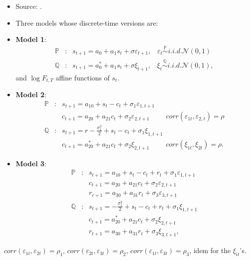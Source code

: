 \documentclass[
  12pt,
]{book}
\providecommand{\tightlist}{%
  \setlength{\itemsep}{0pt}\setlength{\parskip}{0pt}}
\theoremstyle{definition}
\theoremstyle{definition}
\theoremstyle{definition}
\theoremstyle{definition}
\theoremstyle{remark}
\begin{document}
\begin{itemize}
\tightlist
\item
  Source: \citet{Schwartz_1997}.
\item
  Three models whose discrete-time versions are:
\item
  \textbf{Model 1}:
  \begin{eqnarray*}
  \mathbb{P}&:& s_{t+1} = a_0 + a_1 s_t + \sigma \varepsilon_{t+1}, \; \; \; \varepsilon_t \stackrel{\mathbb{P}}{\sim}  i.i.d. \mathcal{N}(0,1) \\
  \mathbb{Q} &:& s_{t+1} = a^*_0 + a_1 s_t + \sigma \xi_{t+1}, \; \; \; \xi_{t} \stackrel{\mathbb{Q}}{\sim}  i.i.d. \mathcal{N}(0,1),
  \end{eqnarray*}
  and \(\log F_{t,T}\) affine functions of \(s_t\).
\item
  \textbf{Model 2}:
  \begin{eqnarray*}
  \mathbb{P}&:& s_{t+1} = a_{10} + s_t - c_t + \sigma_1 \varepsilon_{1,t+1}\\
  && c_{t+1} = a_{20} + a_{21} c_t + \sigma_2 \varepsilon_{2,t+1}\hspace{1cm} corr (\varepsilon_{1t}, \varepsilon_{2,t}) = \rho \\
  \mathbb{Q}&:& s_{t+1} = r - \frac{\sigma^2_1}{2} + s_t - c_t + \sigma_1  \xi_{1,t+1} \\
  && c_{t+1} = a^*_{20} + a_{21} c_t + \sigma_2 \xi_{2,t+1} \hspace{1cm} corr (\xi_{1t}, \xi_{2t}) = \rho.
  \end{eqnarray*}
\item
  \textbf{Model 3}:
  \begin{eqnarray*}
  \mathbb{P}&:& s_{t+1} = a_{10} + s_t - c_t + r_t + \sigma_1 \varepsilon_{1,t+1} \\
  && c_{t+1}= a_{20} + a_{21} c_t + \sigma_2 \varepsilon_{2,t+1} \\
  && r_{r+1} = a_{30} + a_{31} r_t + \sigma_3 \varepsilon_{3,t+1} \\
  \mathbb{Q}&:& s_{t+1} = -\frac{\sigma^2_1}{2} + s_t - c_t + r_t + \sigma_1 \xi_{1,t+1}\\
  &&c_{t+1} = a^*_{20} + a_{21} c_t + \sigma_2 \xi_{2,t+1} \\
  &&r_{t+1} = a_{30} + a_{31} r_t + \sigma_3 \xi_{3,t+1},
  \end{eqnarray*}
\end{itemize}

\(corr (\varepsilon_{1t}, \varepsilon_{2t}) = \rho_1\), \(corr(\varepsilon_{2t}, \varepsilon_{3t}) = \rho_2\), \(corr(\varepsilon_{1t}, \varepsilon_{3t}) = \rho_3\), idem for the \(\xi_{it}\)'s.
\end{document}
